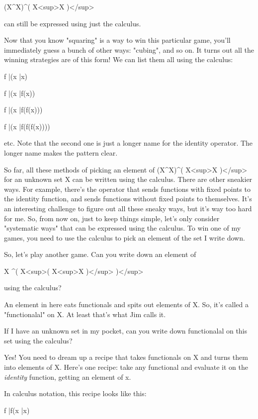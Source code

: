 (X^{X})^{( X<sup>X} )</sup>

can still be expressed using just the \lambda  calculus.

Now that you know "squaring" is a way to win this particular game, 
you'll immediately guess a bunch of other ways: "cubing", and so on.  
It turns out all the winning strategies are of this form!  We can 
list them all using the \lambda  calculus:

f |\to  (x |\to  x)

f |\to  (x |\to  f(x))

f |\to  (x |\to  f(f(x)))

f |\to  (x |\to  f(f(f(x))))

etc.  Note that the second one is just a longer name for the 
identity operator.  The longer name makes the pattern clear.

So far, all these methods of picking an element of 
(X^{X})^{( X<sup>X} )</sup> for an unknown set X can be 
written using the \lambda  calculus.   There are other sneakier ways.  For 
example, there's the operator that sends functions with fixed 
points to the identity function, and sends functions without fixed 
points to themselves.  It's an interesting challenge to figure out all
these sneaky ways, but it's way too hard for me.   So, from now on, 
just to keep things simple, let's only consider "systematic ways"
that can be expressed using the \lambda  calculus.  To win one of my games,
you need to use the \lambda  calculus to pick an element of the set I write
down.

So, let's play another game.  Can you write down an element of

X ^{( X<sup>( X<sup>X} )</sup> )</sup>

using the \lambda  calculus?

An element in here eats functionals and spits out elements of X.  
So, it's called a "functionalal" on X.  At least that's what Jim
calls it.

If I have an unknown set in my pocket, can you write down functionalal 
on this set using the \lambda  calculus?

Yes!  You need to dream up a recipe that takes functionals on X
and turns them into elements of X.   Here's one recipe: take any 
functional and evaluate it on the \emph{identity} function, getting
an element of x.  

In \lambda  calculus notation, this recipe looks like this:

f |\to  f(x |\to  x)

